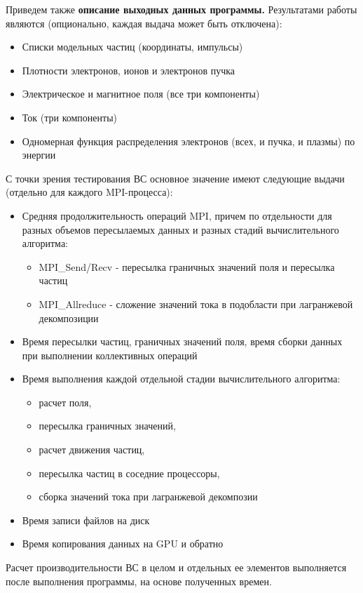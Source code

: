 Приведем также
\textbf{описание выходных данных программы.}
Результатами работы являются
(опционально, каждая выдача может быть отключена):
\begin{itemize}
	\item Списки модельных частиц (координаты, импульсы)
	\item Плотности электронов, ионов и электронов пучка
	\item Электрическое и магнитное поля (все три компоненты)
	\item Ток (три компоненты)
	\item Одномерная функция распределения электронов (всех, и пучка, и плазмы) по энергии
\end{itemize}

С точки зрения тестирования ВС основное значение имеют следующие выдачи (отдельно для каждого MPI-процесса):

\begin{itemize}
	\item Средняя продолжительность операций MPI, причем по отдельности для разных объемов пересылаемых данных и разных стадий вычислительного алгоритма:
	\begin{itemize}
		\item MPI\_Send/Recv - пересылка граничных значений поля и пересылка частиц
		\item MPI\_Allreduce - сложение значений тока в подобласти при лагранжевой декомпозиции
		
	\end{itemize}	
	\item Время пересылки частиц, граничных значений поля, время сборки данных при выполнении коллективных операций   
	\item Время выполнения каждой отдельной стадии вычислительного алгоритма:
	\begin{itemize}
		\item расчет поля, 
		\item пересылка граничных значений, 
		\item расчет движения частиц, 
		\item пересылка частиц в соседние процессоры, 
		\item сборка значений тока при лагранжевой декомпозии
	\end{itemize}
	\item Время записи файлов на диск 
	\item Время копирования данных на GPU и обратно
	
\end{itemize}
Расчет производительности ВС в целом и отдельных ее элементов выполняется после выполнения программы, на основе полученных времен. 



